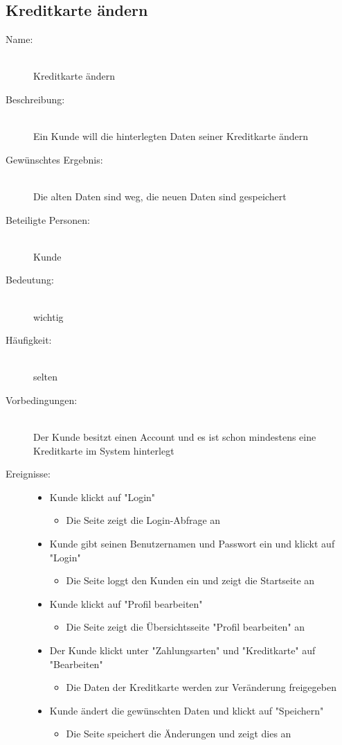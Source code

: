\documentclass[a4paper]{article}
\begin{document}
\subsection{Kreditkarte ändern}
\begin{description}
	\item[Name:]\hfill \\
	Kreditkarte ändern
	\item[Beschreibung:]\hfill \\ 
	Ein Kunde will die hinterlegten Daten seiner Kreditkarte ändern
	\item[Gewünschtes Ergebnis:]\hfill \\ 
	Die alten Daten sind weg, die neuen Daten sind gespeichert
	\item[Beteiligte Personen:]\hfill \\ 
	Kunde
	\item[Bedeutung:]\hfill \\ 
	wichtig
	\item[Häufigkeit:]\hfill \\ 
	selten
	\item[Vorbedingungen:]\hfill \\ 
	Der Kunde besitzt einen Account und es ist schon mindestens eine Kreditkarte im System hinterlegt
	\item[Ereignisse:]\hfill
	\begin{itemize}
		\item Kunde klickt auf "Login"
		\begin{itemize}
			\item Die Seite zeigt die Login-Abfrage an
		\end{itemize}
		\item Kunde gibt seinen Benutzernamen und Passwort ein und klickt auf "Login"
		\begin{itemize}
			\item Die Seite loggt den Kunden ein und zeigt die Startseite an
		\end{itemize}
		\item Kunde klickt auf "Profil bearbeiten"
		\begin{itemize}
			\item Die Seite zeigt die Übersichtsseite "Profil bearbeiten" an
		\end{itemize}
		\item Der Kunde klickt unter "Zahlungsarten" und "Kreditkarte" auf \\"Bearbeiten"
		\begin{itemize}
			\item Die Daten der Kreditkarte werden zur Veränderung freigegeben
		\end{itemize}
		\item Kunde ändert die gewünschten Daten und klickt auf "Speichern"
		\begin{itemize}
			\item Die Seite speichert die Änderungen und zeigt dies an
		\end{itemize}
	\end{itemize}
\end{description}
\end{document}
